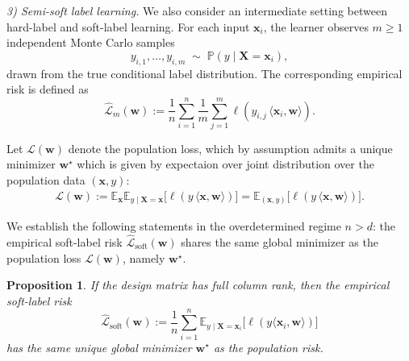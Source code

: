 \documentclass{article}
\theoremstyle{plain}
\newtheorem{proposition}[theorem]{Proposition}
\theoremstyle{definition}
\theoremstyle{remark}
\begin{document}
{\textit{3) Semi-soft label learning.}
We also consider an intermediate setting between hard-label and soft-label learning.
For each input $\boldsymbol x_i$, the learner observes $m \ge 1$ independent Monte Carlo samples
\[
y_{i,1},\ldots,y_{i,m} \;\sim\; \mathbb{P}(y \mid \boldsymbol X=\boldsymbol x_i) ,
\]
drawn from the true conditional label distribution.
The corresponding empirical risk is defined as
\begin{equation}
\widehat{\mathcal L}_{m}(\boldsymbol w)
:=
\frac{1}{n}\sum_{i=1}^n
\frac{1}{m}\sum_{j=1}^m
\ell\!\left(y_{i,j}\,\langle \boldsymbol x_i,\boldsymbol w\rangle\right).
\label{eq:mc-risk}
\end{equation}

Let $\mathcal L(\boldsymbol w)$ denote the population loss, which by assumption admits a unique minimizer $\boldsymbol w^\star$ which is given by expectaion over joint distribution over the population data $(\boldsymbol x,y)$:
\begin{align}
   {\mathcal L}(\boldsymbol w)
:=
\mathbb E_{\boldsymbol x}
\mathbb E_{y \mid \boldsymbol X=\boldsymbol x}
\big[
\ell\!\left(y\,\langle \boldsymbol x,\boldsymbol w\rangle\right)
\big] = \mathbb E_{(\boldsymbol x,y)}\big[
\ell\!\left(y\,\langle \boldsymbol x,\boldsymbol w\rangle\right)].
\end{align}



We establish the following statements in the overdetermined regime $n>d$: the empirical soft-label risk $\widehat{\mathcal L}_{\mathrm{soft}}(\boldsymbol w)$ shares the same global minimizer as the population loss $\mathcal L(\boldsymbol w)$, namely $\boldsymbol w^\star$.



\begin{proposition}
\label{prop:soft_label_minimizer-restate}
If the design matrix has full column rank, then the empirical soft-label risk
\[
\widehat{\mathcal L}_{\mathrm{soft}}(\mathbf w)
:= \frac{1}{n}\sum_{i=1}^n
\mathbb E_{y  \mid \mathbf X=\mathbf x_i}\!\big[\ell(y\langle \mathbf x_i,\mathbf w\rangle)\big]
\]
has the same unique global minimizer $\mathbf w^\star$ as the population risk. 
\end{proposition}

}
\end{document}
